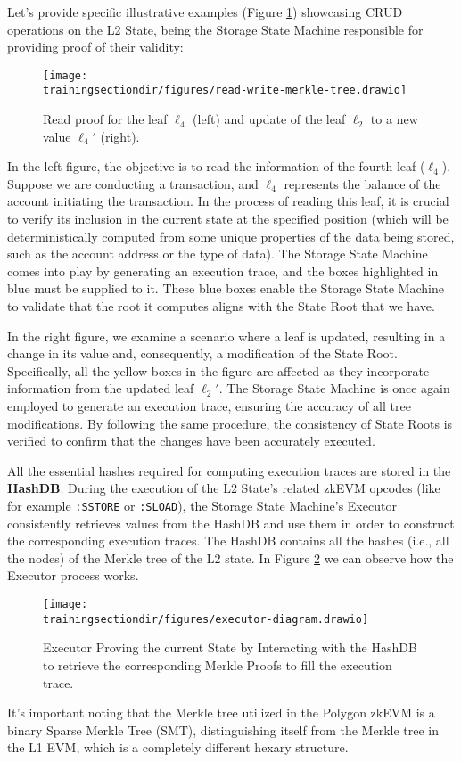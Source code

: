 Let's provide specific illustrative examples (Figure \ref{fig:examples}) showcasing CRUD operations on the L2 State, being the Storage State Machine responsible for providing proof of their validity:

\begin{figure}[H]
\centering
\texttt{[image: \\trainingsectiondir/figures/read-write-merkle-tree.drawio]}
\caption{Read proof for the leaf $\ell_4$ (left) and update of the leaf $\ell_2$ to a new value $\ell_4'$ (right).}
\label{fig:examples}
\end{figure}

In the left figure, the objective is to read the information of the fourth leaf ($\ell_4$). Suppose we are conducting a transaction, and $\ell_4$ represents the balance of the account initiating the transaction. In the process of reading this leaf, it is crucial to verify its inclusion in the current state at the specified position (which will be deterministically computed from some unique properties of the data being stored, such as the account address or the type of data). The Storage State Machine comes into play by generating an execution trace, and the boxes highlighted in blue must be supplied to it. These blue boxes enable the Storage State Machine to validate that the root it computes aligns with the State Root that we have.

In the right figure, we examine a scenario where a leaf is updated, resulting in a change in its value and, consequently, a modification of the State Root. Specifically, all the yellow boxes in the figure are affected as they incorporate information from the updated leaf $\ell_2'$. The Storage State Machine is once again employed to generate an execution trace, ensuring the accuracy of all tree modifications. By following the same procedure, the consistency of State Roots is verified to confirm that the changes have been accurately executed.

All the essential hashes required for computing execution traces are stored in the \textbf{HashDB}. During the execution of the L2 State's related zkEVM opcodes (like for example \texttt{:SSTORE} or  \texttt{:SLOAD}), the Storage State Machine's Executor consistently retrieves values from the HashDB and use them in order to construct the corresponding execution traces. The HashDB contains all the hashes (i.e., all the nodes) of the Merkle tree of the L2 state. In Figure \ref{fig:executor-db-interaction} we can observe how the Executor process works.

\begin{figure}[H]
\centering
\texttt{[image: \\trainingsectiondir/figures/executor-diagram.drawio]}
\caption{Executor Proving the current State by Interacting with the HashDB to retrieve the corresponding Merkle Proofs to fill the execution trace.}
\label{fig:executor-db-interaction}
\end{figure}


It's important noting that the Merkle tree utilized in the Polygon zkEVM is a binary Sparse Merkle Tree (SMT), distinguishing itself from the Merkle tree in the L1 EVM, which is a completely different hexary structure.


